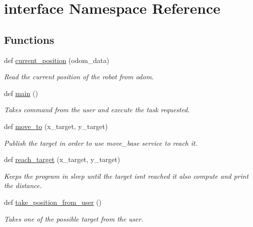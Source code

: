 \hypertarget{namespaceinterface}{}\section{interface Namespace Reference}
\label{namespaceinterface}
\subsection*{Functions}
\begin{DoxyCompactItemize}
\item 
def \hyperlink{namespaceinterface_aca432e6f81aa933df57e2bea65335ee6}{current\+\_\+position} (odom\+\_\+data)
\begin{DoxyCompactList}\small\item\em Read the current position of the robot from odom. \end{DoxyCompactList}\item 
def \hyperlink{namespaceinterface_ac84656acec70183a4ef276f4a3343971}{main} ()
\begin{DoxyCompactList}\small\item\em Takes command from the user and execute the task requested. \end{DoxyCompactList}\item 
def \hyperlink{namespaceinterface_a26cef342aa268117ce542f3465fb6ca0}{move\+\_\+to} (x\+\_\+target, y\+\_\+target)
\begin{DoxyCompactList}\small\item\em Publish the target in order to use move\+\_\+base service to reach it. \end{DoxyCompactList}\item 
def \hyperlink{namespaceinterface_a25416d5ac5c4bc27d42f46875bff174e}{reach\+\_\+target} (x\+\_\+target, y\+\_\+target)
\begin{DoxyCompactList}\small\item\em Keeps the program in sleep until the target isn\textquotesingle{}t reached it also compute and print the distance. \end{DoxyCompactList}\item 
def \hyperlink{namespaceinterface_a0a4ec201152b53b71d452da030b40784}{take\+\_\+position\+\_\+from\+\_\+user} ()
\begin{DoxyCompactList}\small\item\em Takes one of the possible target from the user. \end{DoxyCompactList}\end{DoxyCompactItemize}
